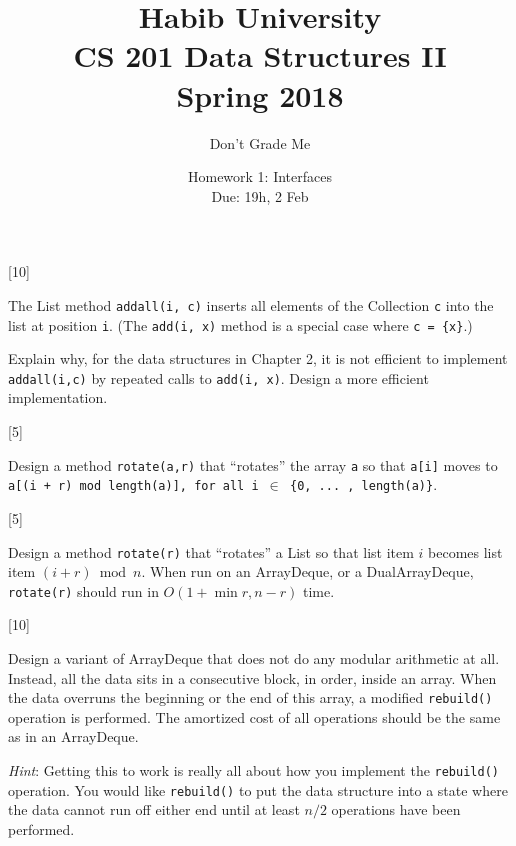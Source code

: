 \documentclass[addpoints]{exam}
\title{Habib University\\CS 201 Data Structures II\\Spring 2018}
\author{Don't Grade Me}  %
\date{Homework 1: Interfaces\\Due: 19h, 2 Feb}
\begin{document}
\maketitle

\begin{questions}

[10]

The List method {\tt add\textunderscore all(i, c)} inserts all elements of the Collection {\tt c} into the list at position {\tt i}. (The {\tt add(i, x)} method is a special case where {\tt c = \{x\}}.)

Explain why, for the data structures in Chapter 2, it is not efficient to implement {\tt add\textunderscore all(i,c)} by repeated calls to {\tt add(i, x)}. Design a more efficient implementation.
\begin{solution}
\end{solution}

[5]

Design a method {\tt rotate(a,r)} that ``rotates'' the array {\tt a} so that {\tt a[i]} moves to {\tt a[(i + r) mod length(a)], for all i $\in$ \{0, ... ,  length(a)\}}.
\begin{solution}
\end{solution}

[5]

Design a method {\tt rotate(r)} that ``rotates'' a List so that list item $i$ becomes list item $(i + r) \bmod n$. When run on an ArrayDeque, or a DualArrayDeque, {\tt rotate(r)} should run in $O(1 + \min{r, n-r})$ time.
\begin{solution}
\end{solution}

[10]

Design a variant of ArrayDeque that does not do any modular arithmetic at all. Instead, all the data sits in a consecutive block, in order, inside an array. When the data overruns the beginning or the end of this array, a modified {\tt rebuild()} operation is performed. The amortized cost of all operations should be the same as in an ArrayDeque.

{\it Hint}: Getting this to work is really all about how you implement the {\tt rebuild()} operation. You would like {\tt rebuild()} to put the data structure into a state where the data cannot run off either end until at least $n/2$ operations have been performed.
\begin{solution}
\end{solution}


\end{questions}
\end{document}

